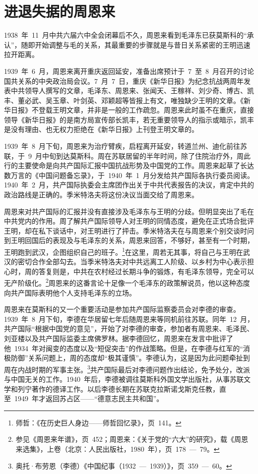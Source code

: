 \section{进退失据的周恩来}

1938~年~11~月中共六届六中全会闭幕后不久，周恩来看到毛泽东已获莫斯科的“承认”，随即开始调整与毛的关系，其最重要的步骤就是与昔日关系紧密的王明迅速拉开距离。

1939~年~6~月，周恩来离开重庆返回延安，准备出席预计于~7~至~8~月召开的讨论国共关系的中央政治局会议。7~月~7~日，重庆《新华日报》为纪念抗战两周年发表中共领导人撰写的文章，毛泽东、周恩来、张闻天、王稼祥、刘少奇、博古、凯丰、董必武、吴玉章、叶剑英、邓颖超等皆报上有文，唯独缺少王明的文章。《新华日报》不登载王明文章，并非是一般的工作疏忽。周恩来此时虽不在重庆，直接领导《新华日报》的是南方局宣传部长凯丰，若无重要领导人的指示或暗示，凯丰是没有理由、也无权力拒绝在《新华日报》上刊登王明文章的。

1939~年~8~月下旬，周恩来为治疗臂疾，启程离开延安，转道兰州、迪化前往苏联，于~9~月中旬到达莫斯科。周在苏联居留的半年时间，除了住院治疗外，周此行的主要使命是向共产国际汇报中国抗战形势及中国党的工作。周恩来起草了长达数万言的《中国问题备忘录》，于~1940~年~1~月分发给共产国际各执行委员阅读。1940~年~2~月，共产国际执委会主席团作出关于中共代表报告的决议，肯定中共的政治路线是正确的。季米特洛夫将这份决议当面交给了周恩来。

周恩来对共产国际的汇报并没有直接涉及毛泽东与王明的分歧。但明显突出了毛在中共党内的作用。周了解共产国际领导人对王明的同情态度，避免在正式场合批评王明，却在私下谈话中，对王明进行了抨击。季米特洛夫在与周恩来个别交谈时问到王明回国后的表现及与毛泽东的关系，周恩来回答，不够好，甚至有一个时期，王明跑到武汉，企图组织自己的班子。\footnote{师哲：《在历史巨人身边——师哲回忆录》，页~141。}在这里，周若无其事，将自己与王明在武汉的密切合作全部勾去。当季米特洛夫对中共远离工人阶级、以乡村为中心表示担心时，周的答复则是，中共在农村经过长期斗争的锻炼，有毛泽东领导，完全可以无产阶级化。\footnote{参见《周恩来年谱》，页~452；周恩来：《关于党的“六大”的研究》，载《周恩来选集》，上卷（北京：人民出版社，1980~年），页~178~—~79。}周恩来的这番言论十足像一个毛泽东的政策解说员，他以这种态度向共产国际表明他个人支持毛泽东的立场。

周恩来在莫斯科的又一个重要活动是参加共产国际监察委员会对李德的审查。1939~年~8~月下旬，李德在华居留七年后随周恩来等同机前往苏联。同年~12~月，共产国际“根据中国党的意见”，开始了对李德的审查，参加者有周恩来、毛泽民、刘亚楼以及共产国际监委主席佛罗林。据李德回忆，周恩来在发言中批评了他~1934~年对闽变的态度以及“短促突击”的作战策略。但是，在李德与红军的“消极防御”关系问题上，周的态度却“极其谨慎”。李德认为，这是因为此问题牵扯到周在内战时期的军事主张。\footnote{奥托·布劳恩（李德）《中国纪事（1932~—~1939）》，页~359~—~60。}共产国际最后对李德问题作出结论，免予处分，改派与中国无关的工作。1940~年后，李德被调往莫斯科外国文学出版社，从事苏联文学和列宁著作的德译工作。以后李德长期在苏联克拉斯诺戈斯克任教，直至~1949~年才返回苏占区——“德意志民主共和国”。

